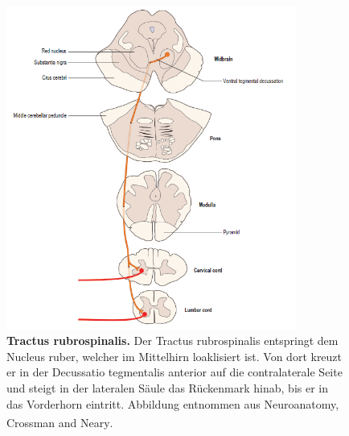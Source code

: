 \documentclass[12pt,a4paper,pdftex]{article}
\begin{document}
\begin{figure}[H]
    \centering
    \includegraphics[width=0.85\textwidth]{pictures/Bilder_Laura/rubrospinal_tract.PNG}
    \caption[Tractus rubrospinalis]{\textbf{Tractus rubrospinalis.} Der Tractus rubrospinalis entspringt dem Nucleus ruber, welcher im Mittelhirn loaklisiert ist. Von dort kreuzt er in der Decussatio tegmentalis anterior auf die contralaterale Seite und steigt in der lateralen Säule das Rückenmark hinab, bis er in das Vorderhorn eintritt. Abbildung entnommen aus Neuroanatomy, Crossman and Neary\textsuperscript{\cite[8]{crossman2014neuroanatomy}}.}
    \label{fig:tr_rubrospinalis}
\end{figure}
\end{document}
